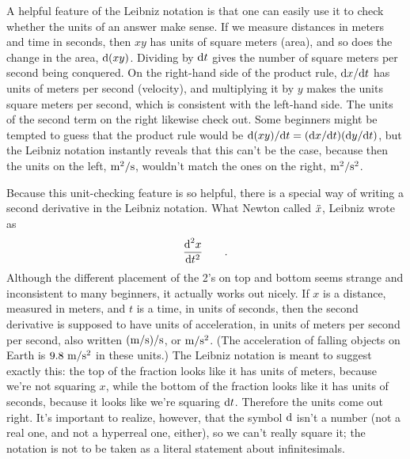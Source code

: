 \pagebreak[4]
A helpful feature of the Leibniz notation is that one can easily use it to check whether the units of an
answer make sense. If we measure distances in meters and time in seconds, then $xy$ has units of
square meters (area), and so does the change in the area, $\textup{d}(xy)$. Dividing by $\textup{d} t$ gives the
number of square meters per second being conquered. On the right-hand side of the product rule,
$\textup{d} x/\textup{d} t$ has units of meters per second (velocity), and multiplying it by
$y$ makes the units square meters per second, which is consistent with the left-hand side. The
units of the second term on the right likewise check out. Some beginners might be tempted to
guess that the product rule would be $\textup{d}(xy)/\textup{d} t=(\textup{d} x/\textup{d} t)(\textup{d} y/\textup{d} t)$, but the Leibniz
notation instantly reveals that this can't be the case, because then the units on the left,
$\textup{m}^2/\textup{s}$, wouldn't match the ones on the right, $\textup{m}^2/\textup{s}^2$.

\pagebreak[4]
Because this unit-checking feature is so helpful, there is a special way of writing a second
derivative in the Leibniz notation. What Newton called $\Ddot{x}$, Leibniz wrote as
\begin{equation*}
  \frac{\textup{d}^2 x}{\textup{d} t^2} \qquad .
\end{equation*}
Although the different placement of the 2's on top and bottom seems strange and inconsistent to many
beginners, it actually works out nicely.
If $x$ is a distance, measured in meters, and $t$ is a time, in units of seconds, then the
second derivative is supposed to have units of acceleration, in units of meters per second per
second, also written $(\textup{m}/\textup{s})/\textup{s}$, or $\textup{m}/\textup{s}^2$. (The acceleration of falling
objects on Earth is $9.8\ \munit/\sunit^2$ in these units.) The Leibniz notation is meant to suggest
exactly this: the top of the fraction looks like it has units of meters, because we're not squaring $x$,
while the bottom of the fraction looks like it has units of seconds, because it looks like we're
squaring $\textup{d} t$. Therefore the units come out right. It's important to realize, however, that
the symbol $\textup{d}$ isn't a number (not a real one, and not a hyperreal one, either), so we can't really
square it; the notation is not to be taken as a literal statement about infinitesimals.

\vfill\pagebreak[4]

